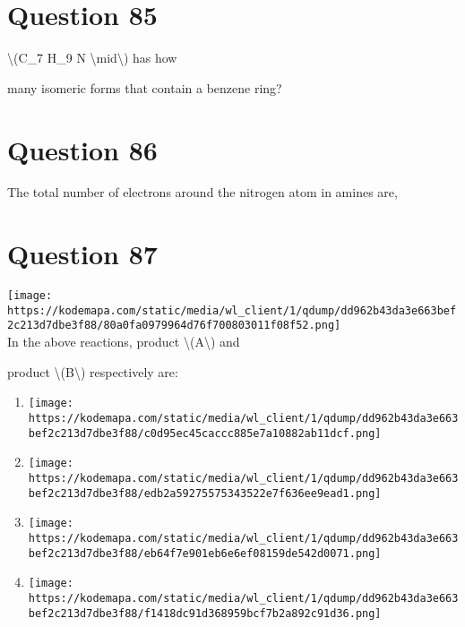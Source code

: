 \documentclass{article}
\begin{document}
\section*{Question 85}
\textbackslash(C\_7 H\_9 N \textbackslash mid\textbackslash) has how

many isomeric forms that contain a benzene ring?


\begin{enumerate}[label=(\alph*)]
\end{enumerate}
\newpage
\section*{Question 86}
The total number of electrons around the nitrogen atom in amines are,


\begin{enumerate}[label=(\alph*)]
\end{enumerate}
\newpage
\section*{Question 87}
\texttt{[image: https://kodemapa.com/static/media/wl\_client/1/qdump/dd962b43da3e663bef2c213d7dbe3f88/80a0fa0979964d76f700803011f08f52.png]}\\



In the above reactions, product \textbackslash(A\textbackslash) and

product \textbackslash(B\textbackslash) respectively are:


\begin{enumerate}[label=(\alph*)]
\item \texttt{[image: https://kodemapa.com/static/media/wl\_client/1/qdump/dd962b43da3e663bef2c213d7dbe3f88/c0d95ec45caccc885e7a10882ab11dcf.png]}


\item \texttt{[image: https://kodemapa.com/static/media/wl\_client/1/qdump/dd962b43da3e663bef2c213d7dbe3f88/edb2a59275575343522e7f636ee9ead1.png]}


\item \texttt{[image: https://kodemapa.com/static/media/wl\_client/1/qdump/dd962b43da3e663bef2c213d7dbe3f88/eb64f7e901eb6e6ef08159de542d0071.png]}


\item \texttt{[image: https://kodemapa.com/static/media/wl\_client/1/qdump/dd962b43da3e663bef2c213d7dbe3f88/f1418dc91d368959bcf7b2a892c91d36.png]}


\end{enumerate}
\newpage
\end{document}
